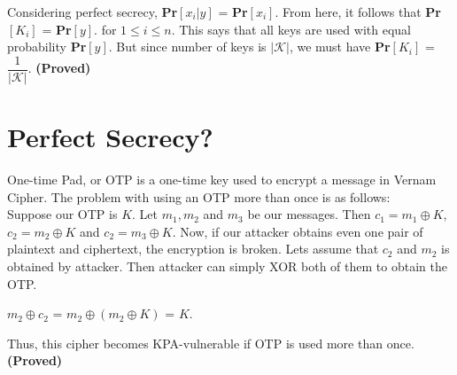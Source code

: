 \documentclass[12pt]{article}
\begin{document}
\begin{large}
Considering perfect secrecy, \textbf{Pr}$[x_i|y]$ = \textbf{Pr}$[x_i]$. From here, it follows that \textbf{Pr}$[K_i]$ = \textbf{Pr}$[y]$. for $1 \le i \le n$. This says that all keys are used with equal probability \textbf{Pr}$[y]$. But since number of keys is $|\mathcal{K}|$, we must have \textbf{Pr}$[K_i]$ = $\dfrac{1}{|\mathcal{K}|}$. \textbf{(Proved)}


\end{large}

\section{Perfect Secrecy?}
\begin{large}

One-time Pad, or OTP is a one-time key used to encrypt a message in Vernam Cipher. The problem with using an OTP more than once is as follows:\\
Suppose our OTP is $K$. Let $m_1,m_2$ and $m_3$ be our messages. Then $c_1 = m_1 \oplus K$, $c_2 = m_2 \oplus K$ and $c_2 = m_3 \oplus K$. Now, if our attacker obtains even one pair of plaintext and ciphertext, the encryption is broken. Lets assume that $c_2$ and $m_2$ is obtained by attacker. Then attacker can simply XOR both of them to obtain the OTP.
\begin{center}
$m_2 \oplus c_2$ = $m_2 \oplus (m_2 \oplus K)$ = $K$.
\end{center}
Thus, this cipher becomes KPA-vulnerable if OTP is used more than once. \textbf{(Proved)}

\end{large}
\end{document}
